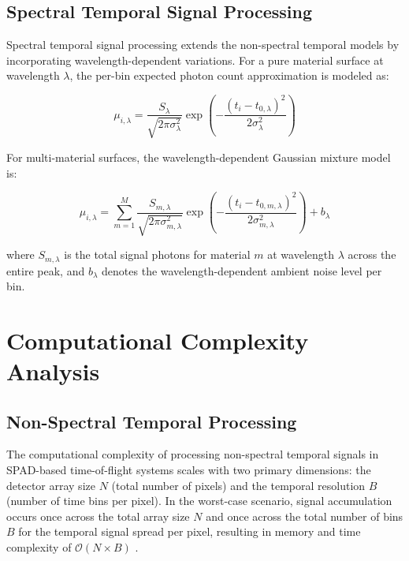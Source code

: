 \documentclass[11pt]{article}
\begin{document}
\subsection{Spectral Temporal Signal Processing}

Spectral temporal signal processing extends the non-spectral temporal models by incorporating wavelength-dependent variations. For a pure material surface at wavelength $\lambda$, the per-bin expected photon count approximation is modeled as:

\begin{equation}
\mu_{i,\lambda} = \frac{S_\lambda}{\sqrt{2\pi\sigma_\lambda^2}} \exp\left(-\frac{(t_i - t_{0,\lambda})^2}{2\sigma_\lambda^2}\right)
\label{eq:spectral_temporal_pure_material}
\end{equation}

For multi-material surfaces, the wavelength-dependent Gaussian mixture model is:

\begin{equation}
\mu_{i,\lambda} = \sum_{m=1}^{M} \frac{S_{m,\lambda}}{\sqrt{2\pi\sigma_{m,\lambda}^2}} \exp\left(-\frac{(t_i - t_{0,m,\lambda})^2}{2\sigma_{m,\lambda}^2}\right) + b_\lambda
\label{eq:spectral_temporal_mixture}
\end{equation}

where $S_{m,\lambda}$ is the total signal photons for material $m$ at wavelength $\lambda$ across the entire peak, and $b_\lambda$ denotes the wavelength-dependent ambient noise level per bin.

\section{Computational Complexity Analysis}

\subsection{Non-Spectral Temporal Processing}

The computational complexity of processing non-spectral temporal signals in SPAD-based time-of-flight systems scales with two primary dimensions: the detector array size $N$ (total number of pixels) and the temporal resolution $B$ (number of time bins per pixel). In the worst-case scenario, signal accumulation occurs once across the total array size $N$ and once across the total number of bins $B$ for the temporal signal spread per pixel, resulting in memory and time complexity of $\mathcal{O}(N \times B)$ \cite{knuth1976}.
\end{document}
